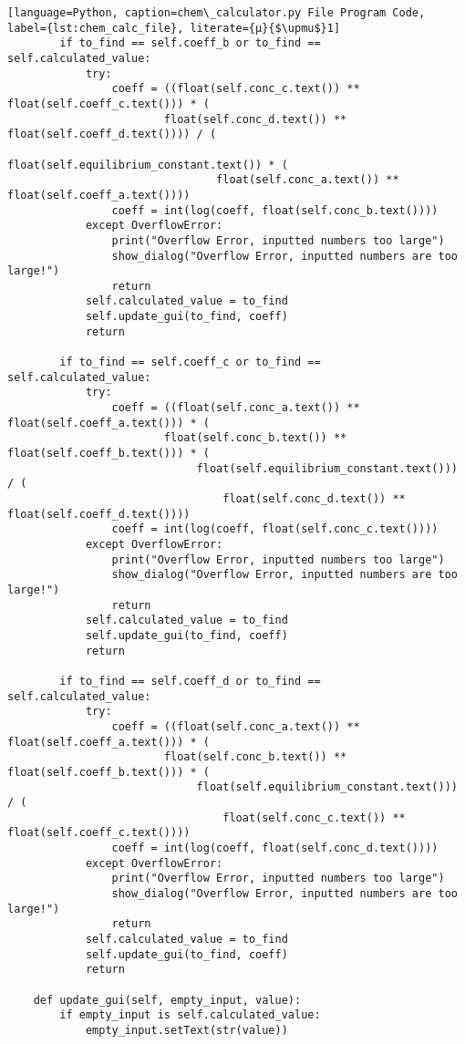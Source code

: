 \begin{lstlisting}[language=Python, caption=chem\_calculator.py File Program Code, label={lst:chem_calc_file}, literate={μ}{$\upmu$}1]
        if to_find == self.coeff_b or to_find == self.calculated_value:
            try:
                coeff = ((float(self.conc_c.text()) ** float(self.coeff_c.text())) * (
                        float(self.conc_d.text()) ** float(self.coeff_d.text()))) / (
                                float(self.equilibrium_constant.text()) * (
                                float(self.conc_a.text()) ** float(self.coeff_a.text())))
                coeff = int(log(coeff, float(self.conc_b.text())))
            except OverflowError:
                print("Overflow Error, inputted numbers too large")
                show_dialog("Overflow Error, inputted numbers are too large!")
                return
            self.calculated_value = to_find
            self.update_gui(to_find, coeff)
            return

        if to_find == self.coeff_c or to_find == self.calculated_value:
            try:
                coeff = ((float(self.conc_a.text()) ** float(self.coeff_a.text())) * (
                        float(self.conc_b.text()) ** float(self.coeff_b.text())) * (
                             float(self.equilibrium_constant.text())) / (
                                 float(self.conc_d.text()) ** float(self.coeff_d.text())))
                coeff = int(log(coeff, float(self.conc_c.text())))
            except OverflowError:
                print("Overflow Error, inputted numbers too large")
                show_dialog("Overflow Error, inputted numbers are too large!")
                return
            self.calculated_value = to_find
            self.update_gui(to_find, coeff)
            return

        if to_find == self.coeff_d or to_find == self.calculated_value:
            try:
                coeff = ((float(self.conc_a.text()) ** float(self.coeff_a.text())) * (
                        float(self.conc_b.text()) ** float(self.coeff_b.text())) * (
                             float(self.equilibrium_constant.text())) / (
                                 float(self.conc_c.text()) ** float(self.coeff_c.text())))
                coeff = int(log(coeff, float(self.conc_d.text())))
            except OverflowError:
                print("Overflow Error, inputted numbers too large")
                show_dialog("Overflow Error, inputted numbers are too large!")
                return
            self.calculated_value = to_find
            self.update_gui(to_find, coeff)
            return

    def update_gui(self, empty_input, value):
        if empty_input is self.calculated_value:
            empty_input.setText(str(value))



\end{lstlisting}

